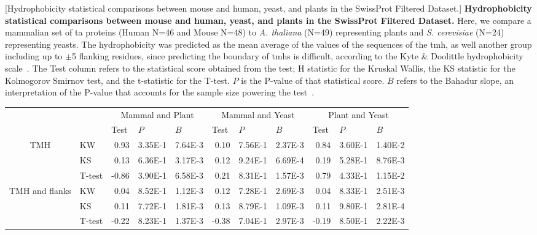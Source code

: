 \begin{table}[htbp]
\centering
{}[Hydrophobicity statistical comparisons between mouse and human, yeast, and plants in the SwissProt Filtered Dataset.]
{\textbf{Hydrophobicity statistical comparisons between mouse and human, yeast, and plants in the SwissProt Filtered Dataset.}
Here, we compare a mammalian set of \gls{ta} proteins (Human N=46 and Mouse N=48) to \textit{A. thaliana} (N=49) representing plants  and  \textit{S. cerevisiae} (N=24) representing yeasts.
The hydrophobicity was predicted as the mean average of the values of the sequences of the \gls{tmh}, as well another group including up to $\pm$5 flanking residues, since predicting the boundary of \gls{tmh}s is difficult, according to the Kyte \& Doolittle hydrophobicity scale~\cite{Kyte1982}.
The Test column refers to the statistical score obtained from the test; H statistic for the Kruskal Wallis, the KS statistic for the Kolmogorov Smirnov test, and the t-statistic for the T-test.
$P$ is the P-value of that statistical score.
$B$ refers to the Bahadur slope, an interpretation of the P-value that accounts for the sample size powering the test~\cite{Bahadur1967, Bahadur1971}.}
\tiny

    \begin{tabular}{clrrrrrrrrr}
          &       & \multicolumn{3}{c}{Mammal and Plant} & \multicolumn{3}{c}{Mammal and Yeast} & \multicolumn{3}{c}{Plant and Yeast} \\
          &       & \multicolumn{1}{l}{Test} & \multicolumn{1}{l}{$P$} & \multicolumn{1}{l}{$B$} & \multicolumn{1}{l}{Test} & \multicolumn{1}{l}{$P$} & \multicolumn{1}{l}{$B$} & \multicolumn{1}{l}{Test} & \multicolumn{1}{l}{$P$} & \multicolumn{1}{l}{$B$} \\
    \multirow{3}[0]{*}{TMH } &  KW & 0.93  & 3.35E-1 & 7.64E-3 & 0.10  & 7.56E-1 & 2.37E-3 & 0.84  & 3.60E-1 & 1.40E-2 \\
          &  KS & 0.13  & 6.36E-1 & 3.17E-3 & 0.12  & 9.24E-1 & 6.69E-4 & 0.19  & 5.28E-1 & 8.76E-3 \\
          &  T-test & -0.86 & 3.90E-1 & 6.58E-3 & 0.21  & 8.31E-1 & 1.57E-3 & 0.79  & 4.33E-1 & 1.15E-2 \\
    \multirow{3}[0]{*}{TMH and flanks } &  KW & 0.04  & 8.52E-1 & 1.12E-3 & 0.12  & 7.28E-1 & 2.69E-3 & 0.04  & 8.33E-1 & 2.51E-3 \\
          &  KS & 0.11  & 7.72E-1 & 1.81E-3 & 0.13  & 8.79E-1 & 1.09E-3 & 0.11  & 9.80E-1 & 2.81E-4 \\
          &  T-test & -0.22 & 8.23E-1 & 1.37E-3 & -0.38 & 7.04E-1 & 2.97E-3 & -0.19 & 8.50E-1 & 2.22E-3 \\
    \end{tabular}%
                \label{table:speciestableswissprotstats}

\end{table}%

